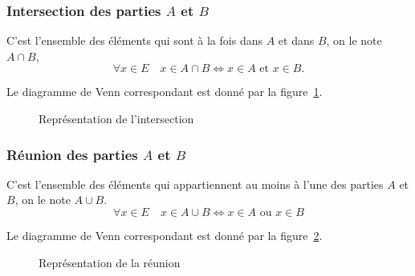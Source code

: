 \subsubsection{Intersection des parties \(A\) et \(B\)}\label{chap3-subsubsec:intersection}

C'est l'ensemble des éléments qui sont à la fois dans \(A\) et dans \(B\), on le
note \(A \cap B\),
\begin{equation}
  \forall{}x \in{}E \quad x \in{}A \cap{} B \iff{}x \in{}A \text{~et~} x \in{}B.
\end{equation}

Le diagramme de Venn correspondant est donné par la figure~\ref{chap3-fig:inter}.

\begin{figure}[p]
  \centering
  \caption{Représentation de l'intersection}\label{chap3-fig:inter}
\end{figure}

\subsubsection{Réunion des parties \(A\) et \(B\)}\label{chap3-subsubsec:reunion}

C'est l'ensemble des éléments qui appartiennent au moins à l'une des parties
\(A\) et \(B\), on le note \(A \cup B\).
\begin{equation}
  \forall{}x \in{}E \quad x \in{}A \cup{}B \iff{}x \in{}A \text{~ou~} x \in{}B
\end{equation}

Le diagramme de Venn correspondant est donné par la figure~\ref{chap3-fig:reunion}.

\begin{figure}[p]
  \centering
  \caption{Représentation de la réunion}\label{chap3-fig:reunion}
\end{figure}

